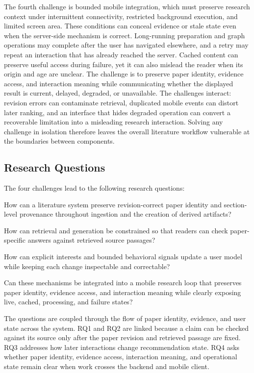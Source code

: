 The fourth challenge is bounded mobile integration, which must preserve research context under intermittent connectivity, restricted background execution, and limited screen area.
These conditions can conceal evidence or stale state even when the server-side mechanism is correct.
Long-running preparation and graph operations may complete after the user has navigated elsewhere, and a retry may repeat an interaction that has already reached the server.
Cached content can preserve useful access during failure, yet it can also mislead the reader when its origin and age are unclear.
The challenge is to preserve paper identity, evidence access, and interaction meaning while communicating whether the displayed result is current, delayed, degraded, or unavailable.
The challenges interact: revision errors can contaminate retrieval, duplicated mobile events can distort later ranking, and an interface that hides degraded operation can convert a recoverable limitation into a misleading research interaction.
Solving any challenge in isolation therefore leaves the overall literature workflow vulnerable at the boundaries between components.

\subsection{Research Questions}

The four challenges lead to the following research questions:

\begin{description}[leftmargin=2.3cm,style=nextline]
  \item[RQ1] How can a literature system preserve revision-correct paper identity and section-level provenance throughout ingestion and the creation of derived artifacts?
  \item[RQ2] How can retrieval and generation be constrained so that readers can check paper-specific answers against retrieved source passages?
  \item[RQ3] How can explicit interests and bounded behavioral signals update a user model while keeping each change inspectable and correctable?
  \item[RQ4] Can these mechanisms be integrated into a mobile research loop that preserves paper identity, evidence access, and interaction meaning while clearly exposing live, cached, processing, and failure states?
\end{description}

The questions are coupled through the flow of paper identity, evidence, and user state across the system.
RQ1 and RQ2 are linked because a claim can be checked against its source only after the paper revision and retrieved passage are fixed.
RQ3 addresses how later interactions change recommendation state.
RQ4 asks whether paper identity, evidence access, interaction meaning, and operational state remain clear when work crosses the backend and mobile client.

